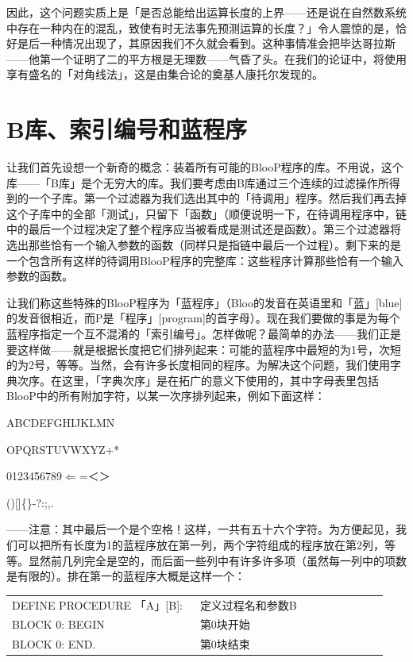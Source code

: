 \documentclass[
  12pt,
  twoside,
  openright,
  oldfontcommands,
]{memoir}
\begin{document}
因此，这个问题实质上是「是否总能给出运算长度的上界------还是说在自然数系统中存在一种内在的混乱，致使有时无法事先预测运算的长度？」令人震惊的是，恰好是后一种情况出现了，其原因我们不久就会看到。这种事情准会把毕达哥拉斯------他第一个证明了二的平方根是无理数------气昏了头。在我们的论证中，将使用享有盛名的「对角线法」，这是由集合论的奠基人康托尔发现的。

\section{B库、索引编号和蓝程序}

让我们首先设想一个新奇的概念：装着所有可能的BlooP程序的库。不用说，这个库------「B库」是个无穷大的库。我们要考虑由B库通过三个连续的过滤操作所得到的一个子库。第一个过滤器为我们选出其中的「待调用」程序。然后我们再去掉这个子库中的全部「测试」，只留下「函数」（顺便说明一下，在待调用程序中，链中的最后一个过程决定了整个程序应当被看成是测试还是函数）。第三个过滤器将选出那些恰有一个输入参数的函数（同样只是指链中最后一个过程）。剩下来的是一个包含所有这样的待调用BlooP程序的完整库：这些程序计算那些恰有一个输入参数的函数。

让我们称这些特殊的BlooP程序为「蓝程序」（Bloo的发音在英语里和「蓝」{[}blue{]}的发音很相近，而P是「程序」{[}program{]}的首字母）。现在我们要做的事是为每个蓝程序指定一个互不混淆的「索引编号」。怎样做呢？最简单的办法------我们正是要这样做------就是根据长度把它们排列起来：可能的蓝程序中最短的为1号，次短的为2号，等等。当然，会有许多长度相同的程序。为解决这个问题，我们使用字典次序。在这里，「字典次序」是在拓广的意义下使用的，其中字母表里包括BlooP中的所有附加字符，以某一次序排列起来，例如下面这样：

ABCDEFGHIJKLMN

OPQRSTUVWXYZ+*

0123456789$\Leftarrow$=＜＞

(){[}{]}\{\}-\textquotesingle?:;,.

------注意：其中最后一个是个空格！这样，一共有五十六个字符。为方便起见，我们可以把所有长度为1的蓝程序放在第一列，两个字符组成的程序放在第2列，等等。显然前几列完全是空的，而后面一些列中有许多许多项（虽然每一列中的项数是有限的）。排在第一的蓝程序大概是这样一个：

\begin{longtable}[]{>{\raggedright\arraybackslash}p{0.47\linewidth} >{\raggedright\arraybackslash}p{0.47\linewidth}}
\toprule\noalign{}
\endhead
\bottomrule\noalign{}
\endlastfoot
DEFINE PROCEDURE 「A」{[}B{]}: & 定义过程名和参数B \\
BLOCK 0: BEGIN & 第0块开始 \\
BLOCK 0: END. & 第0块结束 \\
\end{longtable}
\end{document}
